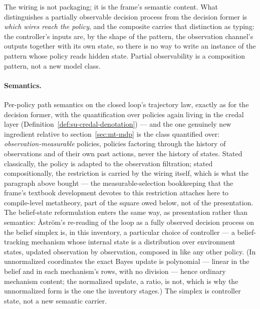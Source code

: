 The wiring is not packaging; it is the frame's semantic content.
What distinguishes a partially observable decision process from the
decision former is \emph{which wires reach the policy}, and the
composite carries that distinction as typing: the controller's inputs
are, by the shape of the pattern, the observation channel's outputs
together with its own state, so there is no way to write an instance
of the pattern whose policy reads hidden state.  Partial
observability is a composition pattern, not a new model class.

\paragraph{Semantics.} Per-policy path semantics on the closed loop's
trajectory law, exactly as for the decision former, with the
quantification over policies again living in the credal layer
(Definition~\ref{def:su-credal-denotation}) --- and the one genuinely
new ingredient relative to section~\ref{sec:mt-mdp} is the class
quantified over: \emph{observation-measurable} policies, policies
factoring through the history of observations and of their own past
actions, never the history of states.  Stated classically, the policy
is adapted to the observation filtration; stated compositionally, the
restriction is carried by the wiring itself, which is what the
paragraph above bought --- the measurable-selection bookkeeping that
the frame's textbook development devotes to this restriction attaches
here to compile-level metatheory, part of the square owed below, not
of the presentation.  The belief-state
reformulation enters the same way, as presentation rather than
semantics: {\AA}str{\"o}m's re-reading of the loop as a fully
observed decision process on the belief simplex \cite{astrom-1965}
is, in this inventory, a particular choice of controller --- a
belief-tracking mechanism whose internal state is a distribution over
environment states, updated observation by observation, composed in
like any other policy.  (In unnormalized coordinates the exact Bayes
update is polynomial --- linear in the belief and in each mechanism's
rows, with no division --- hence ordinary mechanism content; the
normalized update, a ratio, is not, which is why the unnormalized
form is the one the inventory stages.)
The simplex is controller state, not a new semantic carrier.

